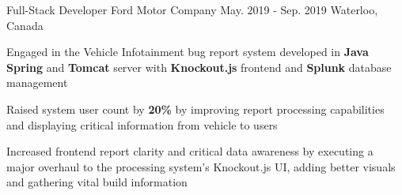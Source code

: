 \begin{cventries}
  \cventry
    {Full-Stack Developer} %
    {Ford Motor Company} %
    {May. 2019 - Sep. 2019} %
    {Waterloo, Canada} %
    {
      \begin{cvitems} %
        \item {Engaged in the Vehicle Infotainment bug report system developed in \textbf{Java Spring} and \textbf{Tomcat} server with \textbf{Knockout.js} frontend and \textbf{Splunk} database management}
        \item {Raised system user count by \textbf{20\%} by improving report processing capabilities and displaying critical information from vehicle to users}
        \item {Increased frontend report clarity and critical data awareness by executing a major overhaul to the processing system's Knockout.js UI, adding better visuals and gathering vital build information}
      \end{cvitems}
    }

\end{cventries}
